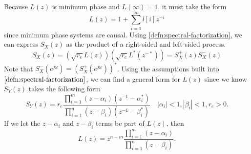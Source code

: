 Because $L(z)$ is minimum phase and $L(\infty)=1$, it must take the form \[
	L(z) = 1 + \sum_{i=1}^\infty l[i]z^{-i}
\] since minimum phase systems are causal.
Using \cref{defn:spectral-factorization}, we can express $S_X(z)$ as the product of a right-sided and left-sided process.
\[
	S_X(z) = (\sqrt{r_e}L(z))(\sqrt{r_e}L^*(z^{-*})) = S_X^+(z)S_X^-(z)
\]
Note that $S_X^-(e^{j\omega}) = \left(S_X^+(e^{j\omega})\right)^*$.
Using the assumptions built into $\cref{defn:spectral-factorization}$, we can find a general form for $L(z)$ since we know $S_Y(z)$ takes the following form
\[
	S_Y(z) = r_e \frac{\prod_{i=1}^m(z-\alpha_i)(z^{-1}-\alpha_i^*)}{\prod_{i=1}^n(z-\beta_i)(z^{-1}-\beta_i^*)}\quad |\alpha_i| < 1, |\beta_i| < 1, r_e > 0.
\]
If we let the $z - \alpha_i$ and $z-\beta_i$ terms be part of $L(z)$, then
\[
	L(z) = z^{n-m}\frac{\prod_{i=1}^m(z-\alpha_i)}{\prod_{i=1}^n(z-\beta_i)}.
\]
